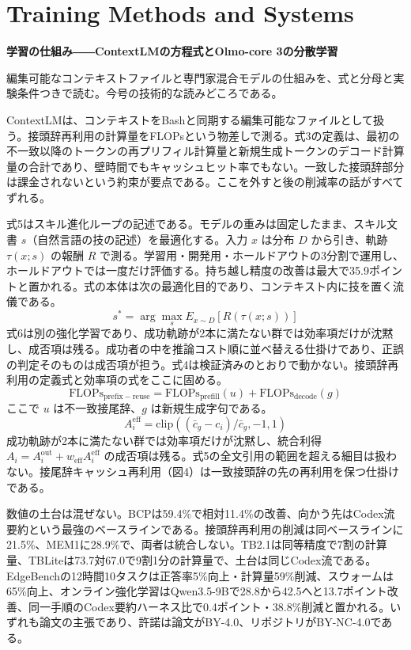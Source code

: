 \section{Training Methods and Systems}
\begin{wideflow}
{\Large\bfseries 学習の仕組み――ContextLMの方程式とOlmo-core 3の分散学習}\par
\smallskip
{\color{SurveyMuted}編集可能なコンテキストファイルと専門家混合モデルの仕組みを、式と分母と実験条件つきで読む。今号の技術的な読みどころである。}\par
\end{wideflow}

ContextLMは、コンテキストをBashと同期する編集可能なファイルとして扱う\cite{contextlm}。接頭辞再利用の計算量をFLOPsという物差しで測る。式3の定義は、最初の不一致以降のトークンの再プリフィル計算量と新規生成トークンのデコード計算量の合計であり、壁時間でもキャッシュヒット率でもない。一致した接頭辞部分は課金されないという約束が要点である。ここを外すと後の削減率の話がすべてずれる。

式5はスキル進化ループの記述である。モデルの重みは固定したまま、スキル文書 \(s\)（自然言語の技の記述）を最適化する。入力 \(x\) は分布 \(D\) から引き、軌跡 \(\tau(x;s)\) の報酬 \(R\) で測る。学習用・開発用・ホールドアウトの3分割で運用し、ホールドアウトでは一度だけ評価する。持ち越し精度の改善は最大で35.9ポイントと置かれる。式の本体は次の最適化目的であり、コンテキスト内に技を置く流儀である。
\[ s^* = \arg\max_s E_{x\sim D}[R(\tau(x;s))] \]
式6は別の強化学習であり、成功軌跡が2本に満たない群では効率項だけが沈黙し、成否項は残る。成功者の中を推論コスト順に並べ替える仕掛けであり、正誤の判定そのものは成否項が担う。式4は検証済みのとおりで動かない。接頭辞再利用の定義式と効率項の式をここに固める。
\[ \mathrm{FLOPs}_{\mathrm{prefix-reuse}} = \mathrm{FLOPs}_{\mathrm{prefill}}(u) + \mathrm{FLOPs}_{\mathrm{decode}}(g) \]
ここで \(u\) は不一致接尾辞、\(g\) は新規生成字句である。
\[ A_i^{\mathrm{eff}} = \mathrm{clip}((\bar{c}_g - c_i)/\bar{c}_g, -1, 1) \]
成功軌跡が2本に満たない群では効率項だけが沈黙し、統合利得 \(A_i = A_i^{\mathrm{out}} + w_{\mathrm{eff}} A_i^{\mathrm{eff}}\) の成否項は残る。式5の全文引用の範囲を超える細目は扱わない。接尾辞キャッシュ再利用（図4）は一致接頭辞の先の再利用を保つ仕掛けである。

数値の土台は混ぜない。BCPは59.4\%で相対11.4\%の改善、向かう先はCodex流要約という最強のベースラインである。接頭辞再利用の削減は同ベースラインに21.5\%、MEM1に28.9\%で、両者は統合しない。TB2.1は同等精度で7割の計算量、TBLiteは73.7対67.0で9割1分の計算量で、土台は同じCodex流である。EdgeBenchの12時間10タスクは正答率5\%向上・計算量59\%削減、スウォームは65\%向上、オンライン強化学習はQwen3.5-9Bで28.8から42.5へと13.7ポイント改善、同一手順のCodex要約ハーネス比で0.4ポイント・38.8\%削減と置かれる。いずれも論文の主張であり、許諾は論文がBY-4.0、リポジトリがBY-NC-4.0である。


